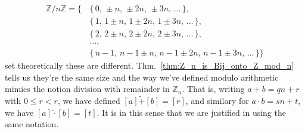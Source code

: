     \begin{equation}
        \begin{split}
            \mathbb{Z}/n\mathbb{Z}=
            \Big\{\,&\{\,0,\,\pm{n},\,\pm{2n},\,\pm{3n},\,\dots\,\},\\
                &\{\,1,\,1\pm{n},\,1\pm{2n},\,1\pm{3n},\,\dots\,\},\\
                &\{\,2,\,2\pm{n},\,2\pm{2n},\,2\pm{3n},\,\dots\,\},\\
                &\dots,\\
                &\{\,n-1,\,n-1\pm{n},\,n-1\pm{2n},\,n-1\pm{3n},\,
                    \dots\,\}\Big\}
        \end{split}
    \end{equation}
    set theoretically these are different.
    Thm.~\ref{thm:Z_n_is_Bij_onto_Z_mod_n} tells us they're the same
    size and the way we've defined modulo arithmetic mimics the notion
    division with remainder in $\mathbb{Z}_{n}$. That is,
    writing $a+b=qn+r$ with $0\leq{r}<r$, we have defined
    $[a]\tilde{+}[b]=[r]$, and similary for $a\cdot{b}=sn+t$, we have
    $[a]\tilde{\cdot}[b]=[t]$. It is in this sense that we are justified
    in using the same notation.
